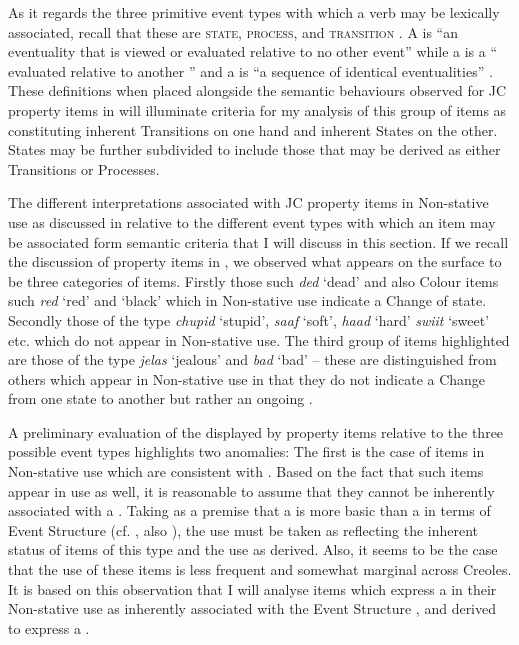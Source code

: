 As it regards the three primitive event types with which a verb may be lexically associated, recall that these are \textsc{state, process}, and \textsc{transition} \citep{Pustejovsky1988,Pustejovsky1991}. A  is ``an eventuality that is viewed or evaluated relative to no other event'' while a  is a `` evaluated relative to another '' and a  is ``a sequence of identical eventualities'' \citep[22--23]{Pustejovsky1988}. These definitions when placed alongside the semantic behaviours observed for JC property items in  will illuminate criteria for my analysis of this group of items as constituting inherent Transitions on one hand and inherent States on the other. States may be further subdivided to include those that may be derived as either Transitions or Processes.

The different interpretations associated with JC property items in Non-stative use as discussed in  relative to the different event types with which an item may be associated form semantic criteria that I will discuss in this section. If we recall the discussion of property items in , we observed what appears on the surface to be three categories of items. Firstly those such \textit{ded} `dead' and also Colour items such \textit{red} `red' and `black' which in Non-stative use indicate a Change of state. Secondly those of the type \textit{chupid} `stupid', \textit{saaf} `soft', \textit{haad} `hard' \textit{swiit} `sweet' etc. which do not appear in Non-stative use. The third group of items highlighted are those of the type \textit{jelas} `jealous' and \textit{bad} `bad' -- these are distinguished from others which appear in Non-stative use in that they do not indicate a Change from one state to another but rather an ongoing . 

A preliminary evaluation of the  displayed by property items relative to the three possible event types highlights two anomalies: The first is the case of items in Non-stative use which are consistent with . Based on the fact that such items appear in  use as well, it is reasonable to assume that they cannot be inherently associated with a  . Taking as a premise that a  is more basic than a  in terms of Event Structure (cf. \citealt{Pustejovsky1991}, also \citealt{Grimshaw1990}), the  use must be taken as reflecting the inherent status of items of this type and the  use as derived. Also, it seems to be the case that the  use of these items is less frequent and somewhat marginal across Creoles. It is based on this observation that I will analyse items which express a  in their Non-stative use as inherently associated with the Event Structure , and derived to express a . 

